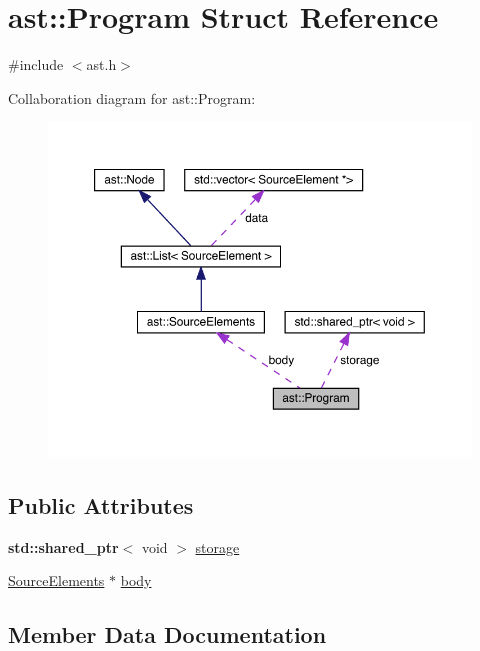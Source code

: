 \hypertarget{structast_1_1_program}{}\section{ast\+:\+:Program Struct Reference}
\label{structast_1_1_program}


{\ttfamily \#include $<$ast.\+h$>$}



Collaboration diagram for ast\+:\+:Program\+:\nopagebreak
\begin{figure}[H]
\begin{center}
\leavevmode
\includegraphics[width=350pt]{structast_1_1_program__coll__graph}
\end{center}
\end{figure}
\subsection*{Public Attributes}
\begin{DoxyCompactItemize}
\item 
\textbf{ std\+::shared\+\_\+ptr}$<$ void $>$ \hyperlink{structast_1_1_program_ad48184fda7dfd12b8f6efa5214a19a26}{storage}
\item 
\hyperlink{structast_1_1_source_elements}{Source\+Elements} $\ast$ \hyperlink{structast_1_1_program_ad81e519bcebed653b4b5d25aacb0c3ef}{body}
\end{DoxyCompactItemize}


\subsection{Member Data Documentation}
\mbox{\label{structast_1_1_program_ad81e519bcebed653b4b5d25aacb0c3ef}} 
